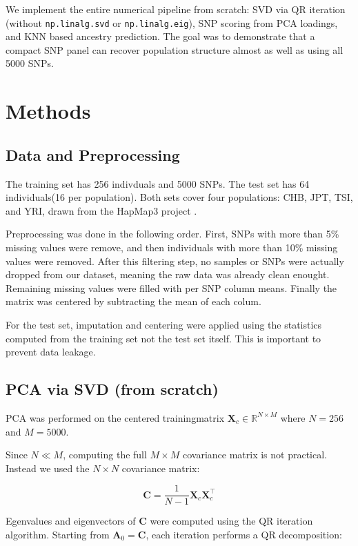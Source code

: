 \documentclass[conference]{IEEEtran}
\begin{document}
We implement the entire numerical pipeline from scratch: SVD via QR iteration (without \texttt{np.linalg.svd} or \texttt{np.linalg.eig}), SNP scoring from PCA loadings, and KNN based ancestry prediction. The goal was to demonstrate that a compact SNP panel can recover population structure almost as well as using all 5000 SNPs.

\section{Methods}

\subsection{Data and Preprocessing}

The training set has 256 indivduals and 5000 SNPs. The test set has 64 individuals(16 per population). Both sets cover four populations: CHB, JPT, TSI, and YRI, drawn from the HapMap3 project \cite{hapmap3}.

Preprocessing was done in the following order. First, SNPs with more than 5\% missing values were remove, and then individuals with more than 10\% missing values were removed. After this filtering step, no samples or SNPs were actually dropped from our dataset, meaning the raw data was already clean enought. Remaining missing values were filled with per SNP column means. Finally the matrix was centered by subtracting the mean of each colum.

For the test set, imputation and centering were applied using the statistics computed from the training set not the test set itself. This is important to prevent data leakage.

\subsection{PCA via SVD (from scratch)}

PCA was performed on the centered trainingmatrix $\mathbf{X}_c \in \mathbb{R}^{N \times M}$ where $N = 256$ and $M = 5000$.

Since $N \ll M$, computing the full $M \times M$ covariance matrix is not practical. Instead we used the $N \times N$ covariance matrix:

\begin{equation}
\mathbf{C} = \frac{1}{N-1} \mathbf{X}_c \mathbf{X}_c^\top
\end{equation}

Egenvalues and eigenvectors of $\mathbf{C}$ were computed using the QR iteration algorithm. Starting from $\mathbf{A}_0 = \mathbf{C}$, each iteration performs a QR decomposition:
\end{document}
